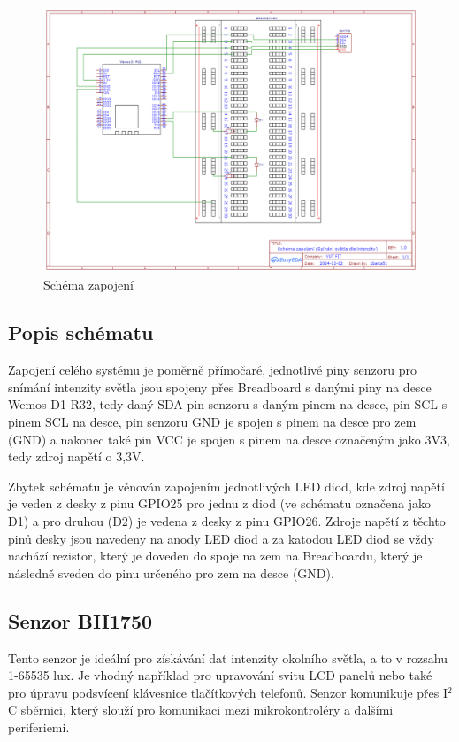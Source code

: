 \documentclass[a4paper, 11pt, hidelinks]{article}
\begin{document}
\begin{figure}[h!]
    \centering
    \includegraphics[width=\linewidth]{Schema_zapojeni_IMP.png}
    \caption{Schéma zapojení}
    \label{fig:schematic}
\end{figure}

\subsection{Popis schématu}
Zapojení celého systému je poměrně přímočaré, jednotlivé piny senzoru pro snímání intenzity světla jsou spojeny přes Breadboard s danými piny na desce Wemos D1 R32, tedy daný SDA pin senzoru s daným pinem na desce, pin SCL s pinem SCL na desce, pin senzoru GND je spojen s pinem na desce pro zem (GND) a nakonec také pin VCC je spojen s pinem na desce označeným jako 3V3, tedy zdroj napětí o 3,3V. 

Zbytek schématu je věnován zapojením jednotlivých LED diod, kde zdroj napětí je veden z desky z pinu GPIO25 pro jednu z diod (ve schématu označena jako D1) a pro druhou (D2) je vedena z desky z pinu GPIO26. Zdroje napětí z těchto pinů desky jsou navedeny na anody LED diod a za katodou LED diod se vždy nachází rezistor, který je doveden do spoje na zem na Breadboardu, který je následně sveden do pinu určeného pro zem na desce (GND). 

\subsection{Senzor BH1750}
Tento senzor je ideální pro získávání dat intenzity okolního světla, a to v rozsahu 1-65535 lux. Je vhodný například pro upravování svitu LCD panelů nebo také pro úpravu podsvícení klávesnice tlačítkových telefonů. \cite{BH1750} Senzor komunikuje přes I$^2$C sběrnici, který slouží pro komunikaci mezi mikrokontroléry a dalšími periferiemi. \cite{I2C}
\end{document}
